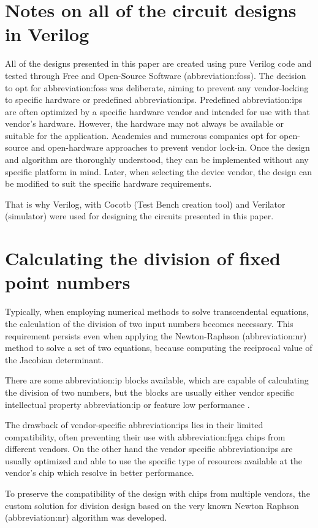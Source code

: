 \documentclass[a4paper, twoside, 11pt]{article}
\begin{document}
\flushbottom %
\newpage

\section{Notes on all of the circuit designs in Verilog}
    All of the designs presented in this paper are created using pure Verilog code and tested through Free and Open-Source Software (\gls{abbreviation:foss}). The decision to opt for \gls{abbreviation:foss}  was deliberate, aiming to prevent any vendor-locking to specific hardware or predefined \gls{abbreviation:ip}s. Predefined \gls{abbreviation:ip}s  are often optimized by a specific hardware vendor and intended for use with that vendor's hardware. However, the hardware may not always be available or suitable for the application. Academics and numerous companies opt for open-source and open-hardware approaches to prevent vendor lock-in. Once the design and algorithm are thoroughly understood, they can be implemented without any specific platform in mind. Later, when selecting the device vendor, the design can be modified to suit the specific hardware requirements.\par
    That is why Verilog, with Cocotb \cite{cocotb} (Test Bench creation tool) and Verilator \cite{verilator} (simulator) were used for designing the circuits presented in this paper.\par

\section{Calculating the division of fixed point numbers}\label{sec:calculating-the-division-of-fixed-point-numbers}
Typically, when employing numerical methods to solve transcendental equations, the calculation of the division of two input numbers becomes necessary. This requirement persists even when applying the Newton-Raphson (\gls{abbreviation:nr}) method to solve a set of two equations, because computing the reciprocal value of the Jacobian determinant.\par
There are some \gls{abbreviation:ip} blocks available, which are capable of calculating the division of two numbers, but the blocks are usually either vendor specific intellectual property \gls{abbreviation:ip} \cite{amd-xilinx-vivado-divider-ip-block} or feature low performance \cite{burke-fixed-point-math-library}.\par
The drawback of vendor-specific \gls{abbreviation:ip}s lies in their limited compatibility, often preventing their use with \gls{abbreviation:fpga} chips from different vendors. On the other hand the vendor specific \gls{abbreviation:ip}s are usually optimized and able to use the specific type of resources available at the vendor's chip which resolve in better performance.\par
To preserve the compatibility of the design with chips from multiple vendors, the custom solution for division design based on the very known Newton Raphson (\gls{abbreviation:nr}) algorithm was developed. \cite{burke-fixed-point-math-library}
\end{document}
